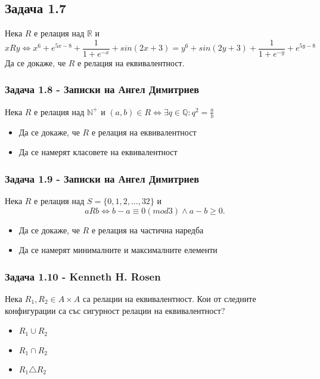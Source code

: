 \documentclass[12pt]{article}
\begin{document}
\subsection*{Задача 1.7}
Нека $R$ е релация над $\mathbb{R}$ и 
\begin{equation*}
    xRy \iff x^6 + e^{5x - 8} + \frac{1}{1+e^{-x}} + sin(2x + 3) = y^6 + sin(2y + 3) + \frac{1}{1+e^{-y}} + e^{5y - 8}
\end{equation*}
Да се докаже, че $R$ е релация на еквивалентност.

\subsubsection*{Задача 1.8 - Записки на Ангел Димитриев}
Нека $R$ е релация над $\mathbb{N}^+$ и $(a, b) \in R \iff \exists q \in \mathbb{Q}: q^2 = \frac{a}{b}$
\begin{itemize}
    \item Да се докаже, че $R$ е релация на еквивалентност
    \item Да се намерят класовете на еквивалентност
\end{itemize}

\subsubsection*{Задача 1.9 - Записки на Ангел Димитриев}
Нека $R$ е релация над $S = \{ 0, 1, 2, ..., 32 \}$ и 
\begin{equation*}
    aRb \iff b - a \equiv 0 (mod 3) \land a - b \geq 0.
\end{equation*}

\begin{itemize}
    \item Да се докаже, че $R$ е релация на частична наредба
    \item Да се намерят минималните и максималните елементи
\end{itemize}

\subsubsection*{Задача 1.10 - Kenneth H. Rosen}
Нека $R_1, R_2 \in A \times A$ са релации на еквивалентност. Кои от следните конфигурации са със сигурност релации на еквивалентност?
\begin{itemize}
    \item $R_1 \cup R_2$
    \item $R_1 \cap R_2$
    \item $R_1 \triangle R_2$
\end{itemize}
\end{document}
